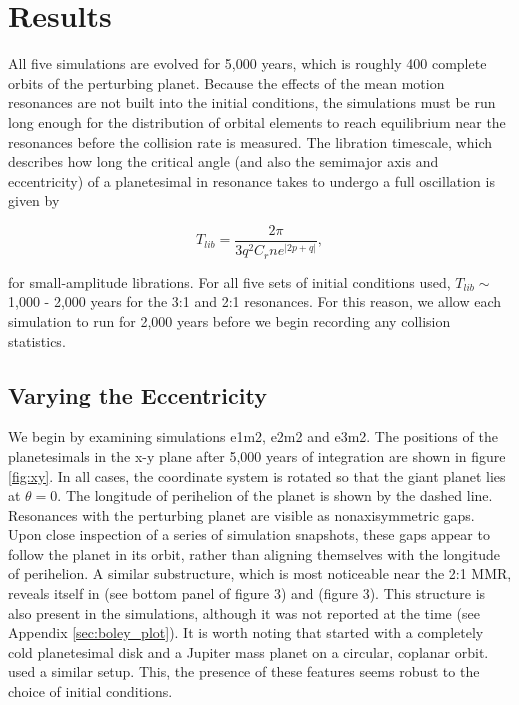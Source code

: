\documentclass[twocolumn]{aastex63}
\begin{document}
\section{Results} \label{sec:results}

All five simulations are evolved for 5,000 years, which is roughly 400 complete orbits of the perturbing planet. Because the effects of the mean 
motion resonances are not built into the initial conditions, the simulations must be run long enough for the distribution of orbital elements to reach 
equilibrium near the resonances before the collision rate is measured. The libration timescale, which describes how long the critical angle (and also 
the semimajor axis and eccentricity) of a planetesimal in resonance takes to undergo a full oscillation is given by

\begin{equation}\label{eq:lib_time}
	T_{lib} = \frac{2 \pi}{3 q^{2} C_{r} n e^{\left| 2p + q \right|}},
\end{equation}

\noindent for small-amplitude librations. For all five sets of initial conditions used, $T_{lib} \sim$ 1,000 - 2,000 years for the 3:1 and 2:1 resonances. 
For this reason, we allow each simulation to run for 2,000 years before we begin recording any collision statistics.

\subsection{Varying the Eccentricity} \label{sec:vary_ecc}

We begin by examining simulations e1m2, e2m2 and e3m2. The positions of the planetesimals in the x-y plane after 5,000 years of integration are 
shown in figure \ref{fig:xy}. In all cases, the coordinate system is rotated so that the giant planet lies at $\theta = 0$. The longitude of perihelion of 
the planet is shown by the dashed line. Resonances with the perturbing planet are visible as nonaxisymmetric gaps. Upon close inspection of a 
series of simulation snapshots, these gaps appear to follow the planet in its orbit, rather than aligning themselves with the longitude of perihelion. A 
similar substructure, which is most noticeable near the 2:1 MMR, reveals itself in \citet{2000Icar..143...45R} (see bottom panel of figure 3) and 
\citet{2016ApJ...818..159T} (figure 3). This structure is also present in the \citet{2017ApJ...850..103B} simulations, although it was not reported at the 
time (see Appendix \ref{sec:boley_plot}). It is worth noting that \citet{2000Icar..143...45R} started with a completely cold planetesimal disk and a 
Jupiter mass planet on a circular, coplanar orbit. \citet{2017ApJ...850..103B} used a similar setup. This, the presence of these features seems robust 
to the choice of initial conditions.
\end{document}
